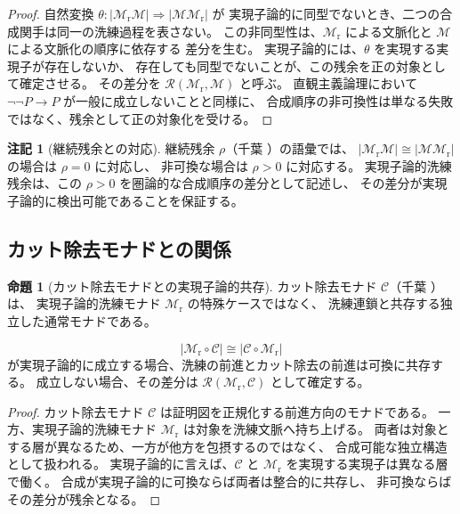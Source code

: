 \documentclass[11pt,a4paper]{article}
\theoremstyle{definition}
\newtheorem{proposition}{命題}[section]
\newtheorem{remark}{注記}[section]
\newcommand{\Mr}{\mathcal{M}_{\mathrm{r}}}
\begin{document}
\begin{proof}
自然変換 $\theta:|\Mr\mathcal{M}|\Rightarrow|\mathcal{M}\Mr|$ が
実現子論的に同型でないとき、二つの合成関手は同一の洗練過程を表さない。
この非同型性は、$\Mr$ による文脈化と $\mathcal{M}$ による文脈化の順序に依存する
差分を生む。
実現子論的には、$\theta$ を実現する実現子が存在しないか、
存在しても同型でないことが、この残余を正の対象として確定させる。
その差分を $\mathcal{R}(\Mr,\mathcal{M})$ と呼ぶ。
直観主義論理において $\neg\neg P\to P$ が一般に成立しないことと同様に、
合成順序の非可換性は単なる失敗ではなく、残余として正の対象化を受ける。
\end{proof}

\begin{remark}[継続残余との対応]
継続残余 $\rho$（千葉 \cite{Chiba2026continuation}）の語彙では、
$|\Mr\mathcal{M}|\cong|\mathcal{M}\Mr|$ の場合は $\rho=0$ に対応し、
非可換な場合は $\rho>0$ に対応する。
実現子論的洗練残余は、この $\rho>0$ を圏論的な合成順序の差分として記述し、
その差分が実現子論的に検出可能であることを保証する。
\end{remark}

\subsection{カット除去モナドとの関係}

\begin{proposition}[カット除去モナドとの実現子論的共存]
カット除去モナド $\mathcal{C}$（千葉 \cite{Chiba2026cutmonad}）は、
実現子論的洗練モナド $\Mr$ の特殊ケースではなく、
洗練連鎖と共存する独立した通常モナドである。

\begin{equation}
|\Mr\circ\mathcal{C}| \cong |\mathcal{C}\circ\Mr|
\end{equation}
が実現子論的に成立する場合、洗練の前進とカット除去の前進は可換に共存する。
成立しない場合、その差分は $\mathcal{R}(\Mr,\mathcal{C})$ として確定する。
\end{proposition}

\begin{proof}
カット除去モナド $\mathcal{C}$ は証明図を正規化する前進方向のモナドである。
一方、実現子論的洗練モナド $\Mr$ は対象を洗練文脈へ持ち上げる。
両者は対象とする層が異なるため、一方が他方を包摂するのではなく、
合成可能な独立構造として扱われる。
実現子論的に言えば、$\mathcal{C}$ と $\Mr$ を実現する実現子は異なる層で働く。
合成が実現子論的に可換ならば両者は整合的に共存し、
非可換ならばその差分が残余となる。
\end{proof}
\end{document}
